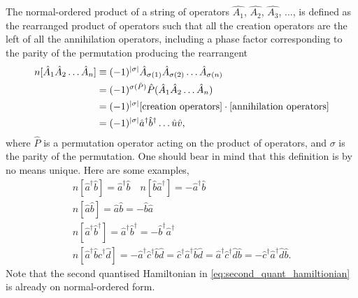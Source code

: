         The normal-ordered product of a string of operators $\hat{A_1}$, $\hat{A_2}$,
        $\hat{A_3}$, $\dots$, is defined as the rearranged product of operators such 
        that all the creation operators are the left of all the annihilation
        operators, including a phase factor corresponding to the parity of the
        permutation producing the rearrangent
        \begin{equation} 
            \begin{aligned}
            n[\hat{A}_1\hat{A}_2 \dots \hat{A}_n ]
            &\equiv (-1)^{\abs{\sigma}}
                \hat{A}_{\sigma(1)}\hat{A}_{\sigma(2)} \dots \hat{A}_{\sigma(n)} \\
            &= (-1)^{\sigma(\hat{P})}\hat{P}(\hat{A}_1\hat{A}_2 \dots \hat{A}_n) \\
            &= (-1)^{\abs{\sigma}}
            [\text{creation operators}] \cdot [\text{annihilation operators}] \\
            &= (-1)^{\abs{\sigma}}\hat{a}^\dagger \hat{b}^\dagger \dots \hat{u} \hat{v},
            \end{aligned}
        \end{equation}
        where $\hat{P}$ is a permutation operator acting on the product of operators, 
        and $\sigma$ is the parity of the permutation. One should bear in mind that this 
        definition is by no means unique. Here are some examples,
        \begin{gather*}
            n[\hat{a}^\dagger \hat{b}] = \hat{a}^\dagger \hat{b} \quad
            n[\hat{b} \hat{a}^\dagger] = -\hat{a}^\dagger \hat{b} \\
            n[\hat{a} \hat{b} ] = \hat{a} \hat{b} = - \hat{b} \hat{a} \\
            n[\hat{a}^\dagger\hat{b}^\dagger ]
                = \hat{a}^\dagger \hat{b}^\dagger 
                = -\hat{b}^\dagger \hat{a}^\dagger \\
            n[\hat{a}^\dagger \hat{b} \hat{c}^\dagger \hat{d}]
                = -\hat{a}^\dagger \hat{c}^\dagger\hat{b} \hat{d} 
                = \hat{c}^\dagger \hat{a}^\dagger\hat{b} \hat{d} 
                = \hat{a}^\dagger \hat{c}^\dagger\hat{d} \hat{b} 
                = -\hat{c}^\dagger \hat{a}^\dagger\hat{d} \hat{b}.
        \end{gather*}
        Note that the second quantised Hamiltonian in \autoref{eq:second_quant_hamiltionian}
        is already on normal-ordered form.

